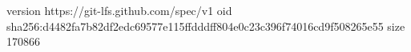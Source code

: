 version https://git-lfs.github.com/spec/v1
oid sha256:d4482fa7b82df2edc69577e115ffdddff804e0c23c396f74016cd9f508265e55
size 170866
